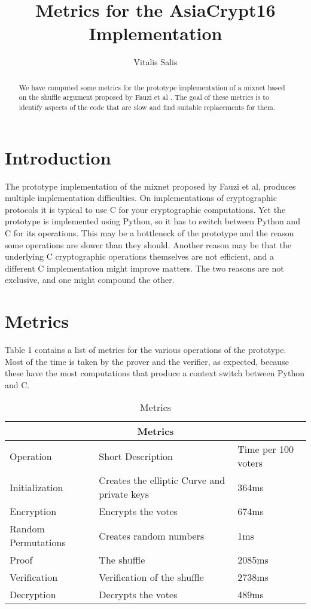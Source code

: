 \documentclass{article}
\date{}
\begin{document}
\title{Metrics for the AsiaCrypt16 Implementation} 

\author{Vitalis Salis}

\maketitle
\begin{abstract}
  We have computed some metrics for the prototype implementation
  \cite{prototype} of a mixnet based on the shuffle argument proposed
  by Fauzi et al \cite{shufflearg}. The goal of these metrics is to
  identify aspects of the code that are slow and find suitable
  replacements for them.
\end{abstract}

\section{Introduction}

The prototype implementation of the mixnet proposed by Fauzi et al,
produces multiple implementation difficulties. On implementations of
cryptographic protocols it is typical to use C for your cryptographic
computations. Yet the prototype is implemented using Python, so it has
to switch between Python and C for its operations. This may be a
bottleneck of the prototype and the reason some operations are slower
than they should. Another reason may be that the underlying C
cryptographic operations themselves are not efficient, and a different
C implementation might improve matters. The two reasons are not
exclusive, and one might compound the other.

\section{Metrics}

Table 1 contains a list of metrics for the various operations of the
prototype. Most of the time is taken by the prover and the verifier,
as expected, because these have the most computations that produce a
context switch between Python and C.

\begin{table}
\begin{tabular}{ |p{3cm}|p{5cm}|p{3cm}|  }
    \hline
    \multicolumn{3}{|c|}{Metrics}\\
    \hline
    Operation & Short Description & Time per 100 voters\\
    \hline
    Initialization & Creates the elliptic Curve and private keys & 364ms\\
    Encryption & Encrypts the votes & 674ms\\
    Random Permutations & Creates random numbers & 1ms\\
    Proof & The shuffle & 2085ms\\
    Verification & Verification of the shuffle & 2738ms\\
    Decryption & Decrypts the votes & 489ms\\
    \hline
\end{tabular}
\caption{Metrics}
\end{table}
\end{document}
